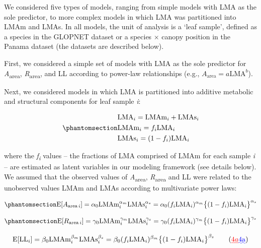 \documentclass[
  12pt,
  letterpaper,
  DIV=11,
  numbers=noendperiod]{scrartcl}
\providecommand{\DIFadd}[1]{{\protect\color{blue}\uwave{#1}}} %
\providecommand{\DIFdel}[1]{{\protect\color{red}\sout{#1}}}                      %
\providecommand{\DIFaddbegin}{} %
\providecommand{\DIFaddend}{} %
\providecommand{\DIFdelbegin}{} %
\providecommand{\DIFdelend}{} %
\newcommand{\DIFscaledelfig}{0.5}
\newlength{\DIFdelgraphicswidth} %
\newlength{\DIFdelgraphicsheight} %
\newcommand{\DIFaddincludegraphics}[2][]{{\color{blue}\fbox{\DIFOincludegraphics[#1]{#2}}}} %
\newcommand{\DIFdelincludegraphics}[2][]{%
\sbox{\DIFdelgraphicsbox}{\DIFOincludegraphics[#1]{#2}}%
\settoboxwidth{\DIFdelgraphicswidth}{\DIFdelgraphicsbox} %
\settoboxtotalheight{\DIFdelgraphicsheight}{\DIFdelgraphicsbox} %
\scalebox{\DIFscaledelfig}{%
\parbox[b]{\DIFdelgraphicswidth}{\usebox{\DIFdelgraphicsbox}\\[-\baselineskip] \rule{\DIFdelgraphicswidth}{0em}}\llap{\resizebox{\DIFdelgraphicswidth}{\DIFdelgraphicsheight}{%
\setlength{\unitlength}{\DIFdelgraphicswidth}%
\begin{picture}(1,1)%
\thicklines\linethickness{2pt} %
{\color[rgb]{1,0,0}\put(0,0){\framebox(1,1){}}}%
{\color[rgb]{1,0,0}\put(0,0){\line( 1,1){1}}}%
{\color[rgb]{1,0,0}\put(0,1){\line(1,-1){1}}}%
\end{picture}%
}\hspace*{3pt}}} %
} %
\DeclareRobustCommand{\DIFaddbegin}{\DIFOaddbegin \let\includegraphics\DIFaddincludegraphics} %
\DeclareRobustCommand{\DIFaddend}{\DIFOaddend \let\includegraphics\DIFOincludegraphics} %
\DeclareRobustCommand{\DIFdelbegin}{\DIFOdelbegin \let\includegraphics\DIFdelincludegraphics} %
\DeclareRobustCommand{\DIFdelend}{\DIFOaddend \let\includegraphics\DIFOincludegraphics} %
\begin{document}
We considered five types of models, ranging from simple models with LMA
as the sole predictor, to more complex models in which LMA was
partitioned into LMAm and LMAs. In all models, the unit of analysis is a
`leaf sample', defined as a species in the GLOPNET dataset or a species
\(\times\) canopy position in the Panama dataset (the datasets are
described below).

First, we considered a simple set of models with LMA as the sole
predictor for \emph{A}\textsubscript{area},
\emph{R}\textsubscript{area}, and LL according to power-law
relationships (e.g., \(A_{\mathrm{area}} = a\mathrm{LMA}^b\)).

Next, we considered models in which LMA is partitioned into additive
metabolic and structural components for leaf sample \emph{i}:

\begin{equation}\phantomsection\label{eq-LMA}{
\begin{aligned}
  &\mathrm{LMA}_{i} =\mathrm{LMAm}_{i} + \mathrm{LMAs}_{i} \\
  &\mathrm{LMAm}_{i} = f_{i} \mathrm{LMA}_{i} \\
  &\mathrm{LMAs}_{i} = (1 - f_{i})  \mathrm{LMA}_{i}
\end{aligned}
}\end{equation}

where the \emph{f\textsubscript{i}} values -- the fractions of LMA
comprised of LMAm for each sample \emph{i} -- are estimated as latent
variables in our modeling framework (see details below). We assumed that
the observed values of \emph{A}\textsubscript{area},
\emph{R}\textsubscript{area} and LL were related to the unobserved
values LMAm and LMAs according to multivariate power laws:

\begin{equation}\phantomsection\label{eq-Aarea}{
\mathrm{E}[A_{\mathrm{area} \, i}]
= \alpha_0\mathrm{LMAm}_{i}^{\alpha_m}\mathrm{LMAs}_i^{\alpha_s}  =  \alpha_0 (f_i \mathrm{LMA}_{i})^{\alpha_m} \bigl\{(1-f_i) \mathrm{LMA}_{i}\bigr\}^{\alpha_s}
}\end{equation}

\begin{equation}\phantomsection\label{eq-Rarea}{
\mathrm{E}[R_{\mathrm{area} \, i}]
= \gamma_0\mathrm{LMAm}_{i}^{\gamma_m} \mathrm{LMAs}_{i}^{\gamma_s}
= \gamma_0 (f_i \mathrm{LMA}_{i})^{\gamma_m} \bigl\{(1-f_i)\mathrm{LMA}_{i}\bigr\}^{\gamma_s}
}\end{equation}

\[
\mathrm{E}[\mathrm{LL}_i] = \beta_0\mathrm{LMAm}_{i}^{\beta_m} \mathrm{LMAs}_{i}^{\beta_s}  = \beta_0 (f_i \mathrm{LMA}_{i})^{\beta_m} \bigl\{(1-f_i) \mathrm{LMA}_{i}\bigr\}^{\beta_s} \qquad(\DIFdelbegin \DIFdel{4a}\DIFdelend \DIFaddbegin \DIFadd{4\mathrm{a}}\DIFaddend )
\]
\end{document}
